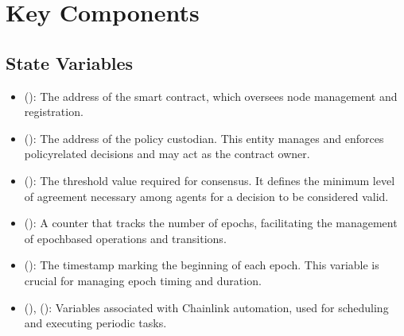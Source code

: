 \documentclass[a4paper,10pt,english]{sphinxmanual}
\begin{document}
\section{Key Components}
\label{\detokenize{docs_consensus_mechanism_contract:key-components}}

\subsection{State Variables}
\label{\detokenize{docs_consensus_mechanism_contract:state-variables}}\begin{itemize}
\item {} 
\sphinxAtStartPar
{} ():
The address of the  smart contract, which oversees node management and registration.

\item {} 
\sphinxAtStartPar
{} ():
The address of the policy custodian. This entity manages and enforces policy\sphinxhyphen{}related decisions and may act as the contract owner.

\item {} 
\sphinxAtStartPar
{} ():
The threshold value required for consensus. It defines the minimum level of agreement necessary among agents for a decision to be considered valid.

\item {} 
\sphinxAtStartPar
{} ():
A counter that tracks the number of epochs, facilitating the management of epoch\sphinxhyphen{}based operations and transitions.

\item {} 
\sphinxAtStartPar
{} ():
The timestamp marking the beginning of each epoch. This variable is crucial for managing epoch timing and duration.

\item {} 
\sphinxAtStartPar
{} (),  ():
Variables associated with Chainlink automation, used for scheduling and executing periodic tasks.


\end{itemize}
\end{document}
